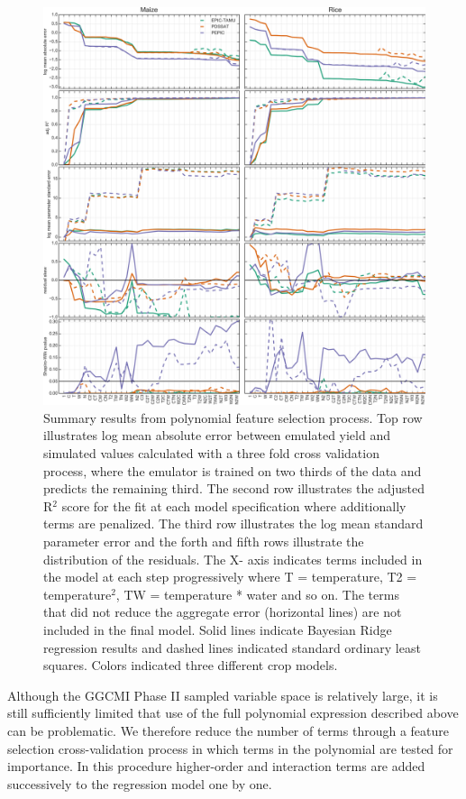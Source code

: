\documentclass[gmd, manuscript]{copernicus} %
\begin{document}
\begin{figure}[ht]
\centering
   \includegraphics[width=12cm]{figures/model_select_maize_rice.png}
   \caption{Summary results from polynomial feature selection process.
   Top row illustrates log mean absolute error between emulated yield and simulated values calculated with a three fold cross validation process, where the emulator is trained on two thirds of the data and predicts the remaining third.
   The second row illustrates the adjusted R$^2$ score for the fit at each model specification where additionally terms are penalized.
   The third row illustrates the log mean standard parameter error and the forth and fifth rows illustrate the distribution of the residuals.
   The X- axis indicates terms included in the model at each step progressively where T = temperature, T2 = temperature$^{2}$, TW  = temperature * water and so on. 
   The terms that did not reduce the aggregate error (horizontal lines) are not included in the final model. 
   Solid lines indicate Bayesian Ridge regression results and dashed lines indicated standard ordinary least squares. 
   Colors indicated three different crop models.}
   \label{fig:features}
\end{figure}

Although the GGCMI Phase II sampled variable space is relatively large, it is still sufficiently limited that use of the full polynomial expression described above can be problematic. 
We therefore reduce the number of terms through a feature selection cross-validation process in which terms in the polynomial are tested for importance. 
In this procedure higher-order and interaction terms are added successively to the regression model one by one. 
\end{document}
